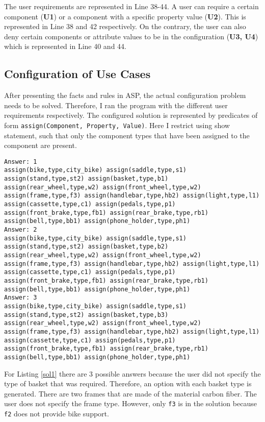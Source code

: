 The user requirements are represented in Line 38-44. A user can require a certain component (\textbf{U1}) or a component with a specific property value (\textbf{U2}). This is represented in Line 38 and 42 respectively. On the contrary, the user can also deny certain components or attribute values to be in the configuration (\textbf{U3, U4}) which is represented in Line 40 and 44.   

\subsection{Configuration of Use Cases}
After presenting the facts and rules in ASP, the actual configuration problem needs to be solved. Therefore, I ran the program with the different user requirements respectively. The configured solution is represented by predicates of form \texttt{assign(Component, Property, Value)}. Here I restrict using show statement, such that only the component types that have been assigned to the component are present. 

\begin{lstlisting}[caption = {Solution User 1}, basicstyle=\ttfamily, label = {sol1}]
Answer: 1
assign(bike,type,city_bike) assign(saddle,type,s1) assign(stand,type,st2) assign(basket,type,b1) assign(rear_wheel,type,w2) assign(front_wheel,type,w2) assign(frame,type,f3) assign(handlebar,type,hb2) assign(light,type,l1) assign(cassette,type,c1) assign(pedals,type,p1) assign(front_brake,type,fb1) assign(rear_brake,type,rb1) assign(bell,type,bb1) assign(phone_holder,type,ph1)
Answer: 2
assign(bike,type,city_bike) assign(saddle,type,s1) assign(stand,type,st2) assign(basket,type,b2) assign(rear_wheel,type,w2) assign(front_wheel,type,w2) assign(frame,type,f3) assign(handlebar,type,hb2) assign(light,type,l1) assign(cassette,type,c1) assign(pedals,type,p1) assign(front_brake,type,fb1) assign(rear_brake,type,rb1) assign(bell,type,bb1) assign(phone_holder,type,ph1)
Answer: 3
assign(bike,type,city_bike) assign(saddle,type,s1) assign(stand,type,st2) assign(basket,type,b3) assign(rear_wheel,type,w2) assign(front_wheel,type,w2) assign(frame,type,f3) assign(handlebar,type,hb2) assign(light,type,l1) assign(cassette,type,c1) assign(pedals,type,p1) assign(front_brake,type,fb1) assign(rear_brake,type,rb1) assign(bell,type,bb1) assign(phone_holder,type,ph1)
\end{lstlisting}

For Listing \ref{sol1} there are 3 possible answers because the user did not specify the type of basket that was required. Therefore, an option with each basket type is generated. There are two frames that are made of the material carbon fiber. The user does not specify the frame type. However, only \texttt{f3} is in the solution because \texttt{f2} does not provide bike support.   


